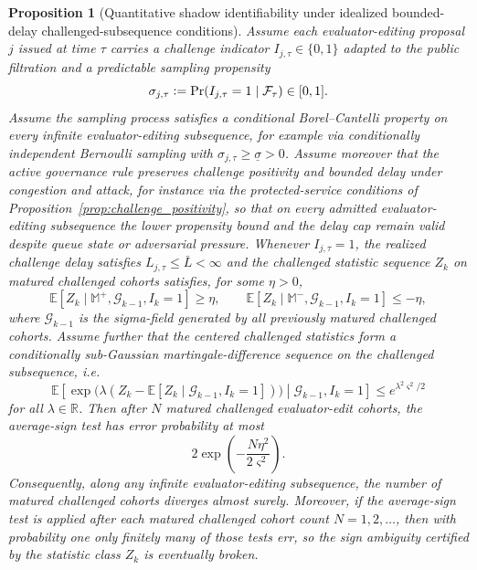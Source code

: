 \documentclass[11pt]{article}
\newtheorem{proposition}[theorem]{Proposition}
\theoremstyle{definition}
\newcommand{\R}{\mathbb{R}}
\newcommand{\E}{\mathbb{E}}
\newcommand{\1}{\mathbf{1}}
\newcommand{\Defeq}{\vcentcolon=}
\begin{document}
\begin{proposition}[Quantitative shadow identifiability under idealized bounded-delay challenged-subsequence conditions]\label{prop:shadow_ident}
Assume each evaluator-editing proposal $j$ issued at time $\tau$ carries a challenge indicator $I_{j,\tau}\in\{0,1\}$ adapted to the public filtration and a predictable sampling propensity
\[
\sigma_{j,\tau}\Defeq \Pr(I_{j,\tau}=1\mid \mathcal F_{\tau})\in[0,1].
\]
Assume the sampling process satisfies a conditional Borel--Cantelli property on every infinite evaluator-editing subsequence, for example via conditionally independent Bernoulli sampling with $\sigma_{j,\tau}\ge \underline\sigma>0$. Assume moreover that the active governance rule preserves challenge positivity and bounded delay under congestion and attack, for instance via the protected-service conditions of Proposition~\ref{prop:challenge_positivity}, so that on every admitted evaluator-editing subsequence the lower propensity bound and the delay cap remain valid despite queue state or adversarial pressure. Whenever $I_{j,\tau}=1$, the realized challenge delay satisfies $L_{j,\tau}\le \bar L<\infty$ and the challenged statistic sequence $Z_k$ on matured challenged cohorts satisfies, for some $\eta>0$,
\[
\E[Z_k\mid \mathbb M^+,\mathcal G_{k-1},I_k=1]\ge \eta,
\qquad
\E[Z_k\mid \mathbb M^-,\mathcal G_{k-1},I_k=1]\le -\eta,
\]
where $\mathcal G_{k-1}$ is the sigma-field generated by all previously matured challenged cohorts. Assume further that the centered challenged statistics form a conditionally sub-Gaussian martingale-difference sequence on the challenged subsequence, i.e.
\[
\E\!\left[\exp\!\bigl(\lambda(Z_k-\E[Z_k\mid \mathcal G_{k-1},I_k=1])\bigr)\middle|\mathcal G_{k-1},I_k=1\right]
\le e^{\lambda^2\varsigma^2/2}
\]
for all $\lambda\in\R$. Then after $N$ matured challenged evaluator-edit cohorts, the average-sign test has error probability at most
\[
2\exp\!\left(-\frac{N\eta^2}{2\varsigma^2}\right).
\]
Consequently, along any infinite evaluator-editing subsequence, the number of matured challenged cohorts diverges almost surely. Moreover, if the average-sign test is applied after each matured challenged cohort count $N=1,2,\dots$, then with probability one only finitely many of those tests err, so the sign ambiguity certified by the statistic class $Z_k$ is eventually broken.
\end{proposition}
\end{document}

